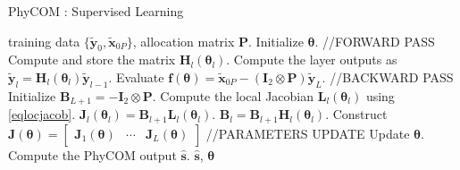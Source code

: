 \documentclass{article}
\begin{document}
%

 \begin{algorithm}[!t]
 \caption{PhyCOM : Supervised Learning}
 \begin{algorithmic}[1]
 \renewcommand{\algorithmicrequire}{\textbf{Input:}}
 \renewcommand{\algorithmicensure}{\textbf{Output:}}
 \REQUIRE training data $\{\tilde{\mathbf{y}}_0,\tilde{\mathbf{x}}_{0P}\}$, allocation matrix $\mathbf{P}$. 
 \STATE Initialize $\boldsymbol \theta$.
  \STATE  //FORWARD PASS
  	 \STATE Compute and store the matrix $\mathbf{H}_{l}(\boldsymbol \theta_{l})$.
   	\STATE Compute the layer outputs as $\tilde{\mathbf{y}}_{l}=\mathbf{H}_{l}(\boldsymbol \theta_l) \tilde{\mathbf{y}}_{l-1}$.
 \ENDFOR
 \STATE Evaluate $\mathbf{f}(\boldsymbol \theta)=\tilde{\mathbf{x}}_{0P}-\left(\mathbf{I}_2\otimes\mathbf{P}\right)\tilde{\mathbf{y}}_L$.
  \STATE  //BACKWARD PASS
  \STATE Initialize $\mathbf{B}_{L+1}=-\mathbf{I}_2\otimes \mathbf{P}$.
  \STATE Compute the local Jacobian $ \mathbf{L}_l(\boldsymbol \theta_{l})$ using \eqref{eqlocjacob}.
   \STATE $\mathbf{J}_l(\boldsymbol \theta_{l})=\mathbf{B}_{l+1}\mathbf{L}_l(\boldsymbol \theta_{l})$.
   \STATE $\mathbf{B}_l=\mathbf{B}_{l+1}\mathbf{H}_{l}(\boldsymbol \theta_{l})$.
  \ENDFOR
  \STATE Construct $\mathbf{J}(\boldsymbol \theta)=\begin{bmatrix}
\mathbf{J}_1(\boldsymbol \theta)&\cdots&\mathbf{J}_L(\boldsymbol \theta)
\end{bmatrix}$
 \ENDIF
\STATE //PARAMETERS UPDATE
  \STATE Update $\boldsymbol \theta$.
    \ENDWHILE
    \STATE Compute the PhyCOM output $\widehat{\mathbf{s}}$.
 \RETURN $\widehat{\mathbf{s}}$, $\boldsymbol \theta$
 \end{algorithmic}\label{algo1}
 \end{algorithm}
 
\end{document}
